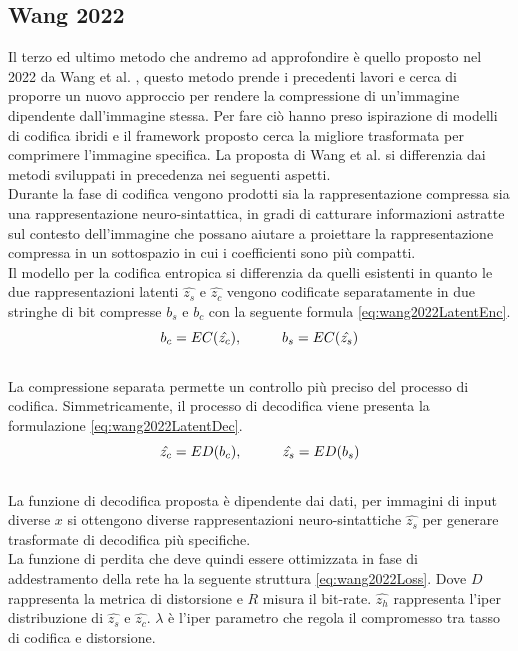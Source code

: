 \subsection{Wang 2022}
Il terzo ed ultimo metodo che andremo ad approfondire è quello proposto nel 2022 da Wang et al. \cite{wang2022neural}, questo metodo prende i precedenti lavori e cerca di proporre un nuovo approccio per rendere la compressione di un’immagine dipendente dall’immagine stessa. Per fare ciò hanno preso ispirazione di modelli di codifica ibridi e il framework proposto cerca la migliore trasformata per comprimere l’immagine specifica. La proposta di Wang et al. si differenzia dai metodi sviluppati in precedenza nei seguenti aspetti.\\
Durante la fase di codifica vengono prodotti sia la rappresentazione compressa sia una rappresentazione neuro-sintattica, in gradi di catturare informazioni astratte sul contesto dell’immagine che possano aiutare a proiettare la rappresentazione compressa in un sottospazio in cui i coefficienti sono più compatti.\\
Il modello per la codifica entropica si differenzia da quelli esistenti in quanto le due rappresentazioni latenti $\hat{z_{s}}$ e $\hat{z_ {c}}$ vengono codificate separatamente in due stringhe di bit compresse $b_{s}$ e $b_{c}$ con la seguente formula \ref{eq:wang2022LatentEnc}.\\
\begin{equation}\label{eq:wang2022LatentEnc}
    b_{c} = EC (\hat{z_{c}}), \hspace{1 cm} b_{s} =  EC (\hat{z_{s}})
\end{equation}\\
La compressione separata permette un controllo più preciso del processo di codifica. Simmetricamente, il processo di decodifica viene presenta la formulazione \ref{eq:wang2022LatentDec}.\\
\begin{equation}\label{eq:wang2022LatentDec}
    \hat{z_{c}} =  ED (b_{c}), \hspace{1 cm} \hat{z_{s}} =  ED (b_{s}) 
\end{equation}\\
La funzione di decodifica proposta è dipendente dai dati, per immagini di input diverse $x$ si ottengono diverse rappresentazioni neuro-sintattiche $\hat{z_ {s}}$ per generare trasformate di decodifica più specifiche.\\
La funzione di perdita che deve quindi essere ottimizzata in fase di addestramento della rete ha la seguente struttura \ref{eq:wang2022Loss}. Dove $D$ rappresenta la metrica di distorsione e $R$ misura il bit-rate. $\hat{z_{h}}$ rappresenta l’iper distribuzione di $\hat{z_{s}}$ e $\hat{z_{c}}$. $\lambda$ è l’iper parametro che regola il compromesso tra tasso di codifica e distorsione.\\
